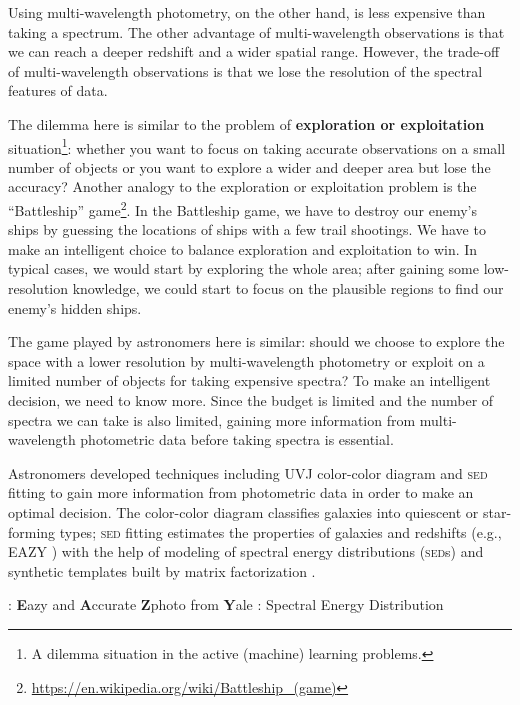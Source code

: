 \documentclass{ar-1col}
\begin{document}
Using multi-wavelength photometry, on the other hand, is less expensive than taking a spectrum. 
The other advantage of multi-wavelength observations is that we can reach a deeper redshift and a wider spatial range.
However, the trade-off of multi-wavelength observations is that we lose the resolution of the spectral features of data.

The dilemma here is similar to the problem of \textbf{ exploration or exploitation } situation\footnote{A dilemma situation in the active (machine) learning problems.}:
whether you want to focus on taking accurate observations on a small number of objects or you want to explore a wider and deeper area but lose the accuracy?
Another analogy to the exploration or exploitation problem is the ``Battleship'' game\footnote{\url{https://en.wikipedia.org/wiki/Battleship_(game)}}.
In the Battleship game, we have to destroy our enemy's ships by guessing the locations of ships with a few trail shootings.
We have to make an intelligent choice to balance exploration and exploitation to win.
In typical cases, we would start by exploring the whole area; after gaining some low-resolution knowledge, we could start to focus on the plausible regions to find our enemy's hidden ships.

The game played by astronomers here is similar: should we choose to explore the space with a lower resolution by multi-wavelength photometry or exploit on a limited number of objects for taking expensive spectra?
To make an intelligent decision, we need to know more.
Since the budget is limited and the number of spectra we can take is also limited, gaining more information from multi-wavelength photometric data before taking spectra is essential.

Astronomers developed techniques including UVJ color-color diagram and \textsc{sed} fitting to gain more information from photometric data in order to make an optimal decision.
The color-color diagram classifies galaxies into quiescent or star-forming types; \textsc{sed} fitting estimates the properties of galaxies and redshifts (e.g., EAZY \citep{Brammer2008}) with the help of modeling of spectral energy distributions (\textsc{sed}s) and synthetic templates built by matrix factorization \citep{Blanton2007}.

\begin{marginnote}
    : \textbf{E}azy and \textbf{A}ccurate \textbf{Z}photo from \textbf{Y}ale
    : Spectral Energy Distribution
\end{marginnote}
\end{document}
